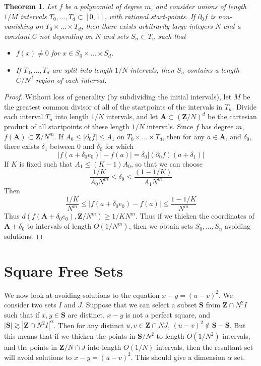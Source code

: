 \documentclass{report}
\theoremstyle{plain}
\theoremstyle{plain}
\newtheorem{theorem}{Theorem}
\begin{document}
\begin{theorem}
    Let $f$ be a polynomial of degree $m$, and consider unions of length $1/M$ intervals $T_0, \dots, T_d \subset [0,1]$, with rational start-points. If $\partial_0 f$ is non-vanishing on $T_0 \times \dots \times T_d$, then there exists arbitrarily large integers $N$ and a constant $C$ not depending on $N$ and sets $S_n \subset T_n$ such that
    \begin{itemize}
        \item $f(x) \neq 0$ for $x \in S_0 \times \dots \times S_d$.
        \item If $T_0, \dots, T_d$ are split into length $1/N$ intervals, then $S_n$ contains a length $C/N^d$ region of each interval.
    \end{itemize}
\end{theorem}
\begin{proof}
    Without loss of generality (by subdividing the initial intervals), let $M$ be the greatest common divisor of all of the startpoints of the intervals in $T_n$. Divide each interval $T_n$ into length $1/N$ intervals, and let $\mathbf{A} \subset (\mathbf{Z}/N)^d$ be the cartesian product of all startpoints of these length $1/N$ intervals. Since $f$ has degree $m$, $f(\mathbf{A}) \subset \mathbf{Z}/N^m$. If $A_0 \leq |\partial_0 f| \leq A_1$ on $T_0 \times \dots \times T_d$, then for any $a \in \mathbf{A}$, and $\delta_0$, there exists $\delta_1$ between $0$ and $\delta_0$ for which
    \[ |f(a + \delta_0 e_0)| - f(a)| = \delta_0 |(\partial_0 f)(a + \delta_1)| \]
    If $K$ is fixed such that $A_1 \leq (K-1)A_0$, so that we can choose
    \[ \frac{1/K}{A_0N^m} \leq \delta_0 \leq \frac{\left( 1 - 1/K \right)}{A_1N^m} \]
    Then
    \[ \frac{1/K}{N^m} \leq |f(a + \delta_0 e_0) - f(a)| \leq \frac{1 - 1/K}{N^m} \]
    Thus $d(f(\mathbf{A} + \delta_0 e_0), \mathbf{Z}/N^m) \geq 1/KN^m$. Thus if we thicken the coordinates of $\mathbf{A} + \delta_0$ to intervals of length $O(1/N^m)$, then we obtain sets $S_0, \dots, S_n$ avoiding solutions.
\end{proof}

\section{Square Free Sets}

We now look at avoiding solutions to the equation $x - y = (u - v)^2$. We consider two sets $I$ and $J$. Suppose that we can select a subset $\mathbf{S}$ from $\mathbf{Z} \cap N^2I$ such that if $x,y \in \mathbf{S}$ are distinct, $x - y$ is not a perfect square, and $|\mathbf{S}| \gtrsim |\mathbf{Z} \cap N^2I|^\alpha$. Then for any distinct $u,v \in \mathbf{Z} \cap NJ$, $(u - v)^2 \not \in \mathbf{S} - \mathbf{S}$. But this means that if we thicken the points in $\mathbf{S}/N^2$ to length $O(1/N^2)$ intervals, and the points in $\mathbf{Z}/N \cap J$ into length $O(1/N)$ intervals, then the resultant set will avoid solutions to $x - y = (u - v)^2$. This should give a dimension $\alpha$ set.
\end{document}
